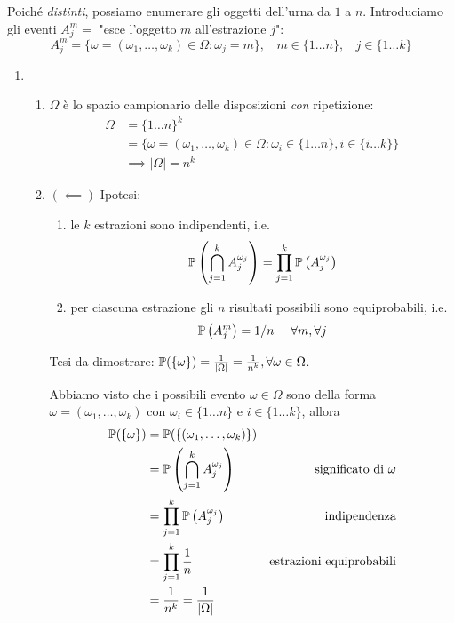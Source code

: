 Poiché \textit{distinti}, possiamo enumerare gli oggetti dell'urna da $1$ a $n$. Introduciamo gli eventi $A_{j}^{m} =$ "esce l'oggetto $m$ all'estrazione $j$":
\begin{equation*}
A_{j}^{m} =\{\omega =( \omega _{1} ,\dots ,\omega _{k}) \in \Omega :\omega _{j} =m\} ,\ \ \ \ m\in \{1\dots n\} ,\ \ \ \ j\in \{1\dots k\}
\end{equation*}
\begin{enumerate}
\item 
\begin{enumerate}
\item $\Omega $ è lo spazio campionario delle disposizioni \textit{con} ripetizione:\begin{align*}
\Omega  & =\{1\dots n\}^{k}\\
 & =\{\omega =( \omega _{1} ,\dots ,\omega _{k}) \in \Omega :\omega _{i} \in \{1\dots n\} ,i\in \{i\dots k\}\}\\
 & \implies | \Omega | =n^{k}
\end{align*}
\item $(\impliedby)$ Ipotesi:
\begin{enumerate}
\item le $k$ estrazioni sono indipendenti, i.e.\begin{equation*}
\mathbb{P}\left(\bigcap _{j=1}^{k} A_{j}^{\omega _{j}}\right) =\prod _{j=1}^{k}\mathbb{P}\left( A_{j}^{\omega _{j}}\right)
\end{equation*}
\item per ciascuna estrazione gli $n$ risultati possibili sono equiprobabili, i.e.\begin{equation*}
\mathbb{P}\left( A_{j}^{m}\right) =1/n\ \ \ \ \forall m,\forall j
\end{equation*}
\end{enumerate}

Tesi da dimostrare: $\mathbb{P}(\{\omega \}) =\frac{1}{| \Omega | } =\frac{1}{n^{k}} ,\forall \omega \in \Omega $.

Abbiamo visto che i possibili evento $\omega \in \Omega $ sono della forma $\omega =( \omega _{1} ,\dots ,\omega _{k})$ con $\omega _{i} \in \{1\dots n\}$ e $i\in \{1\dots k\}$, allora\begin{align*}
\mathbb{P}(\{\omega \}) & =\mathbb{P}(\{( \omega _{1} ,\dots ,\omega _{k})\}) & \\
 & =\mathbb{P}\left(\bigcap _{j=1}^{k} A_{j}^{\omega _{j}}\right) & \text{significato di} \ \omega \\
 & =\prod _{j=1}^{k}\mathbb{P}\left( A_{j}^{\omega _{j}}\right) & \text{indipendenza}\\
 & =\prod _{j=1}^{k}\frac{1}{n} & \text{estrazioni equiprobabili}\\
 & =\frac{1}{n^{k}} =\frac{1}{| \Omega | } & 
\end{align*}


\end{enumerate}
\end{enumerate}

